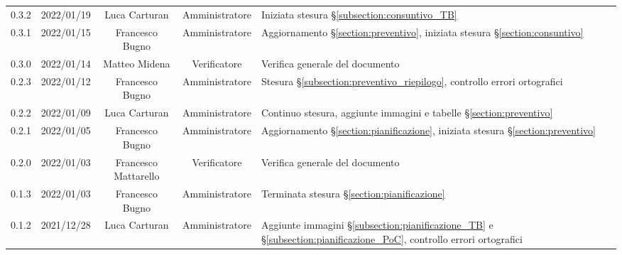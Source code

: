 \begin{center}
\begin{longtable}[c]{c | c | c | c | p{5cm}}
		0.3.2                                                      & 2022/01/19 & Luca Carturan        & Amministratore & Iniziata stesura §\ref{subsection:consuntivo_TB}                                                                                          \\
		0.3.1                                                      & 2022/01/15 & Francesco Bugno      & Amministratore & Aggiornamento §\ref{section:preventivo}, iniziata stesura §\ref{section:consuntivo}                                                       \\
		0.3.0                                                      & 2022/01/14 & Matteo Midena        & Verificatore   & Verifica generale del documento                                                                                                           \\
		0.2.3                                                      & 2022/01/12 & Francesco Bugno      & Amministratore & Stesura §\ref{subsection:preventivo_riepilogo}, controllo errori ortografici                                                              \\
		0.2.2                                                      & 2022/01/09 & Luca Carturan        & Amministratore & Continuo stesura, aggiunte immagini e tabelle §\ref{section:preventivo}                                                                   \\
		0.2.1                                                      & 2022/01/05 & Francesco Bugno      & Amministratore & Aggiornamento §\ref{section:pianificazione}, iniziata stesura §\ref{section:preventivo}                                                   \\
		0.2.0                                                      & 2022/01/03 & Francesco Mattarello & Verificatore   & Verifica generale del documento                                                                                                           \\
		0.1.3                                                      & 2022/01/03 & Francesco Bugno      & Amministratore & Terminata stesura §\ref{section:pianificazione}                                                                                           \\
		0.1.2                                                      & 2021/12/28 & Luca Carturan        & Amministratore & Aggiunte immagini §\ref{subsection:pianificazione_TB} e §\ref{subsection:pianificazione_PoC}, controllo errori ortografici                \\

\end{longtable}
\end{center}
